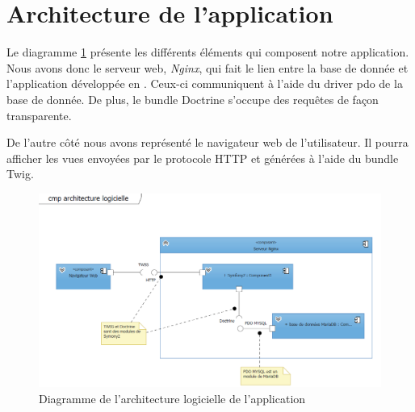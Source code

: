 \section{Architecture de l'application}

Le diagramme \ref{fig::archi_logicielle} présente les différents éléments qui composent notre application. Nous avons donc le serveur web, \textit{Nginx}, qui fait le lien entre la base de donnée \mdb et l'application développée en \symfony. Ceux-ci communiquent à l'aide du driver pdo de la base de donnée. De plus, le bundle Doctrine s'occupe des requêtes \sql de façon transparente.

De l'autre côté nous avons représenté le navigateur web de l'utilisateur. Il pourra afficher les vues envoyées par le protocole HTTP et générées à l'aide du bundle Twig.

\begin{figure}[h!]
	\centering
	\includegraphics[scale=0.5]{ArchitectureLogicielle/archi_logicielle.png}
	\caption{Diagramme de l'architecture logicielle de l'application}
	\label{fig::archi_logicielle}
\end{figure}